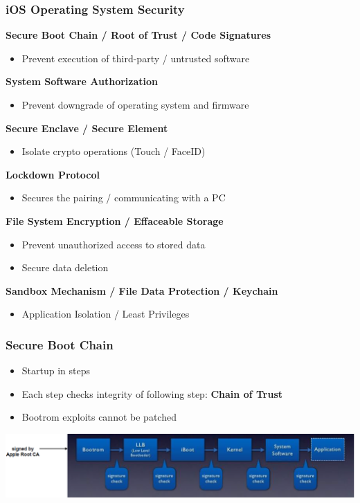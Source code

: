 \subsubsection{iOS Operating System Security}
\textbf{Secure Boot Chain / Root of Trust / Code Signatures}
\begin{itemize}
    \item Prevent execution of third-party / untrusted software
\end{itemize}
\textbf{System Software Authorization}
\begin{itemize}
    \item Prevent downgrade of operating system and firmware
\end{itemize}
\textbf{Secure Enclave / Secure Element}
\begin{itemize}
    \item Isolate crypto operations (Touch / FaceID)
\end{itemize}
\textbf{Lockdown Protocol}
\begin{itemize}
    \item Secures the pairing / communicating with a PC
\end{itemize}
\textbf{File System Encryption / Effaceable Storage}
\begin{itemize}
    \item Prevent unauthorized access to stored data
    \item Secure data deletion
\end{itemize}
\textbf{Sandbox Mechanism / File Data Protection / Keychain}
\begin{itemize}
    \item Application Isolation / Least Privileges
\end{itemize}

\subsubsection{Secure Boot Chain}
\begin{itemize}
    \item Startup in steps
    \item Each step checks integrity of following step: \textbf{Chain of Trust}
    \item Bootrom exploits cannot be patched
\end{itemize}
\includegraphics[width=\linewidth]{../img/secure_boot_chain.png}

